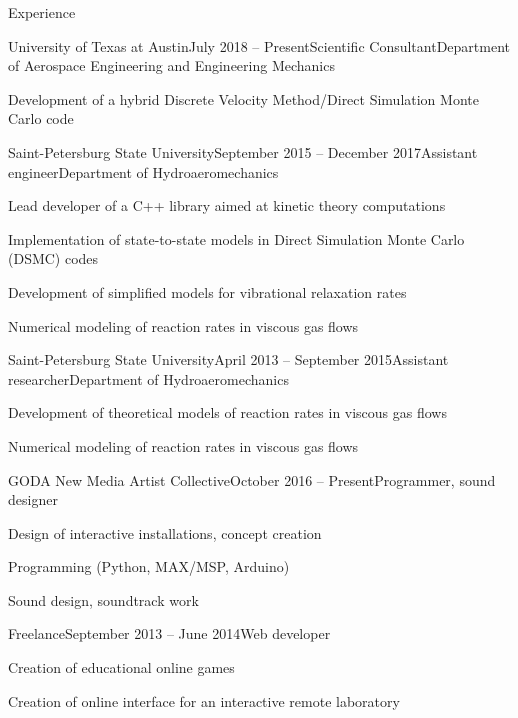 \documentclass{resume} %
\begin{document}

\begin{rSection}{Experience}


\begin{rSubsection}{University of Texas at Austin}{July 2018 -- Present}{Scientific Consultant}{Department of Aerospace Engineering and Engineering Mechanics}
\item Development of a hybrid Discrete Velocity Method/Direct Simulation Monte Carlo code
\end{rSubsection}

\begin{rSubsection}{Saint-Petersburg State University}{September 2015 -- December 2017}{Assistant engineer}{Department of Hydroaeromechanics}
\item Lead developer of a C++ library aimed at kinetic theory computations
\item Implementation of state-to-state models in Direct Simulation Monte Carlo (DSMC) codes
\item Development of simplified models for vibrational relaxation rates
\item Numerical modeling of reaction rates in viscous gas flows
\end{rSubsection}

\begin{rSubsection}{Saint-Petersburg State University}{April 2013 -- September 2015}{Assistant researcher}{Department of Hydroaeromechanics}
\item Development of theoretical models of reaction rates in viscous gas flows
\item Numerical modeling of reaction rates in viscous gas flows
\end{rSubsection}

\begin{rSubsection}{GODA New Media Artist Collective}{October 2016 -- Present}{Programmer, sound designer}{}
\item Design of interactive installations, concept creation
\item Programming (Python, MAX/MSP, Arduino)
\item Sound design, soundtrack work
\end{rSubsection}

\begin{rSubsection}{Freelance}{September 2013 -- June 2014}{Web developer}{}
\item Creation of educational online games
\item Creation of online interface for an interactive remote laboratory
\end{rSubsection}


\end{rSection}
\end{document}
